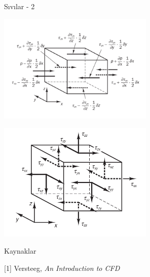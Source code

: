 \documentclass[12pt,fleqn]{article}\usepackage{../../common}
\begin{document}
Sıvılar - 2

\includegraphics[width=20em]{phy_030_fluid2_01.png}

\includegraphics[width=20em]{phy_030_fluid2_02.png}









Kaynaklar

[1] Versteeg, {\em An Introduction to CFD}
\end{document}
